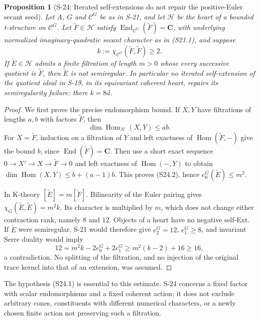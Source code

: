 \documentclass[11pt,a4paper]{article}
\newtheorem{proposition}[theorem]{Proposition}
\theoremstyle{definition}
\begin{document}
\begin{proposition}[S-24: Iterated self-extensions do not repair the positive-Euler secant seed]
\label{prop:semireg-iterated-extensions}
Let $A$, $G$ and $\mathcal C^G$ be as in S-21, and let
$\mathcal H$ be the heart of a bounded t-structure on
$\mathcal C^G$. Let $\widetilde F\in\mathcal H$ satisfy
$\operatorname{End}_{\mathcal C^G}(\widetilde F)=\mathbf C$,
with underlying normalized imaginary-quadratic secant
character as in (S21.1), and suppose
\[
 k:=\chi_{\mathcal C^G}(\widetilde F,\widetilde F)\ge2.
 \tag{S24.1}
\]
If $\widetilde E\in\mathcal H$ admits a finite filtration
of length $m>0$ whose every successive quotient is
$\widetilde F$, then $\widetilde E$ is not semiregular.
In particular no iterated self-extension of the quotient
ideal in S-19, in its equivariant coherent heart, repairs
its semiregularity failure: there $k=8d$.
\end{proposition}
\begin{proof}
We first prove the precise endomorphism bound. If $X,Y$
have filtrations of lengths $a,b$ with factors
$\widetilde F$, then
\[
 \dim\operatorname{Hom}_{\mathcal H}(X,Y)\le ab.
 \tag{S24.2}
\]
For $X=\widetilde F$, induction on a filtration of $Y$
and left exactness of $\operatorname{Hom}(\widetilde F,-)$
give the bound $b$, since
$\operatorname{End}(\widetilde F)=\mathbf C$.
Then use a short exact sequence
$0\to X'\to X\to\widetilde F\to0$ and left exactness
of $\operatorname{Hom}(-,Y)$ to obtain
$\dim\operatorname{Hom}(X,Y)\le b+(a-1)b$.
This proves (S24.2), hence $e_0^G(\widetilde E)\le m^2$.

In K-theory $[\widetilde E]=m[\widetilde F]$.
Bilinearity of the Euler pairing gives
$\chi_G(\widetilde E,\widetilde E)=m^2k$.
Its character is multiplied by $m$, which does not
change either contraction rank, namely $8$ and $12$.
Objects of a heart have no negative self-Ext.
If $\widetilde E$ were semiregular, S-21 would therefore
give $e_2^G=12$, $e_1^G\ge8$, and invariant Serre duality
would imply
\[
 12=m^2k-2e_0^G+2e_1^G
 \ge m^2(k-2)+16\ge16,
\]
a contradiction. No splitting of the filtration, and no
injection of the original trace kernel into that of an
extension, was assumed.
\end{proof}

The hypothesis (S24.1) is essential to this estimate.
S-24 concerns a fixed factor with scalar endomorphisms and a fixed coherent
action; it does not exclude arbitrary cones, constituents
with different numerical characters, or a newly chosen
finite action not preserving such a filtration.
\end{document}
